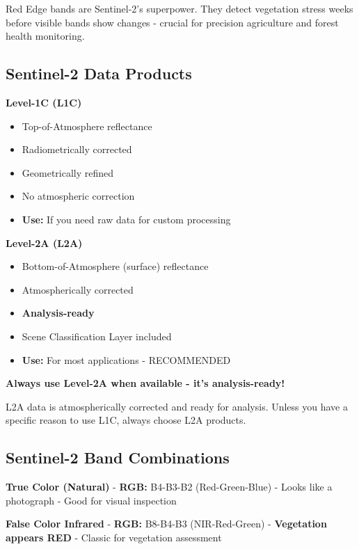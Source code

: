 \documentclass[
  letterpaper,
  DIV=11,
  numbers=noendperiod]{scrartcl}
\providecommand{\tightlist}{%
  \setlength{\itemsep}{0pt}\setlength{\parskip}{0pt}}
\begin{document}
Red Edge bands are Sentinel-2's superpower. They detect vegetation
stress weeks before visible bands show changes - crucial for precision
agriculture and forest health monitoring.

\subsection{Sentinel-2 Data Products}\label{sentinel-2-data-products}

\textbf{Level-1C (L1C)}

\begin{itemize}
\tightlist
\item
  Top-of-Atmosphere reflectance
\item
  Radiometrically corrected
\item
  Geometrically refined
\item
  No atmospheric correction
\item
  \textbf{Use:} If you need raw data for custom processing
\end{itemize}

\textbf{Level-2A (L2A)}

\begin{itemize}
\tightlist
\item
  Bottom-of-Atmosphere (surface) reflectance
\item
  Atmospherically corrected
\item
  \textbf{Analysis-ready}
\item
  Scene Classification Layer included
\item
  \textbf{Use:} For most applications - RECOMMENDED
\end{itemize}

\textbf{Always use Level-2A when available - it's analysis-ready!}

L2A data is atmospherically corrected and ready for analysis. Unless you
have a specific reason to use L1C, always choose L2A products.

\subsection{Sentinel-2 Band
Combinations}\label{sentinel-2-band-combinations}

\textbf{True Color (Natural)} - \textbf{RGB:} B4-B3-B2 (Red-Green-Blue)
- Looks like a photograph - Good for visual inspection

\textbf{False Color Infrared} - \textbf{RGB:} B8-B4-B3 (NIR-Red-Green) -
\textbf{Vegetation appears RED} - Classic for vegetation assessment
\end{document}
